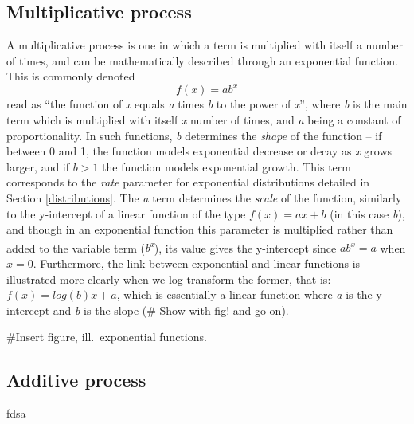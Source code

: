 \documentclass[
  12pt,
]{book}
\begin{document}
\hypertarget{multiplicative-process}{%
\subsection{Multiplicative process}\label{multiplicative-process}}

A multiplicative process is one in which a term is multiplied with itself a number of times, and can be mathematically described through an exponential function. This is commonly denoted \[f(x) = ab^x\] read as ``the function of \emph{x} equals \emph{a} times \emph{b} to the power of \emph{x}'', where \emph{b} is the main term which is multiplied with itself \emph{x} number of times, and \emph{a} being a constant of proportionality. In such functions, \emph{b} determines the \emph{shape} of the function -- if between 0 and 1, the function models exponential decrease or decay as \emph{x} grows larger, and if \(b > 1\) the function models exponential growth. This term corresponds to the \emph{rate} parameter for exponential distributions detailed in Section \ref{distributions}. The \emph{a} term determines the \emph{scale} of the function, similarly to the y-intercept of a linear function of the type \(f(x) = ax+b\) (in this case \emph{b}), and though in an exponential function this parameter is multiplied rather than added to the variable term (\emph{b\textsuperscript{x}}), its value gives the y-intercept since \(ab^x = a\) when \(x = 0\). Furthermore, the link between exponential and linear functions is illustrated more clearly when we log-transform the former, that is: \(f(x) = log(b)x+a\), which is essentially a linear function where \emph{a} is the y-intercept and \emph{b} is the slope (\# Show with fig! and go on).

\#Insert figure, ill.~exponential functions.

\hypertarget{additive-process}{%
\subsection{Additive process}\label{additive-process}}

fdsa
\end{document}
